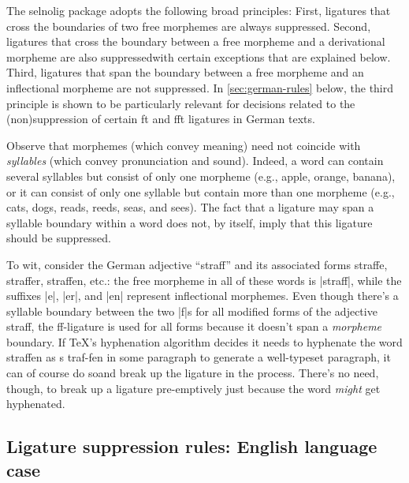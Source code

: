 \documentclass[11pt]{article}
\newcommand{\pkg}[1]{\textsf{#1}}
\begin{document}
The \pkg{selnolig} package adopts the following broad principles: First, ligatures that cross the boundaries of two free morphemes are always suppressed. Second, ligatures that cross the boundary between a free morpheme and a derivational morpheme are also suppressed\textemdash with certain exceptions that are explained below. Third, ligatures that span the boundary between a free morpheme and an inflectional morpheme are not suppressed. In \cref{sec:german-rules} below, the third principle is shown to be particularly relevant for decisions related to the (non)suppression of certain ft and fft ligatures in German texts.

Observe that morphemes (which convey meaning) need not coincide with \emph{syllables} (which convey pronunciation and sound). Indeed, a word can contain several syllables but consist of only one morpheme (e.g., apple, orange, banana), or it can consist of only one syllable but contain more than one morpheme (e.g., cats, dogs, reads, reeds, seas, and sees). The fact that a ligature may span a syllable boundary within a word does not, by itself, imply that this ligature should be suppressed. 

\enlargethispage{1\baselineskip}

To wit, consider the German adjective \enquote{straff} and its associated forms straffe, straffer, straffen, etc.: the free morpheme in all of these words is |straff|, while the suffixes |e|, |er|, and |en| represent inflectional morphemes. Even though there's a syllable boundary between the two |f|s for all modified forms of the adjective straff, the ff-ligature is used for all forms because it doesn't span a \emph{morpheme} boundary. If TeX's hyphenation algorithm decides it needs to hyphenate the word straffen as s\kern0pt traf-fen in some paragraph to generate a well-typeset paragraph, it can of course do so\textemdash and break up the ligature in the process. There's no need, though, to break up a ligature pre-emptively just because the word \emph{might} get hyphenated.



\subsection{Ligature suppression rules: English language case} \label{sec:english-rules}
\end{document}
